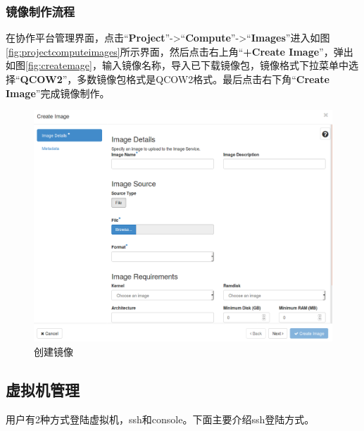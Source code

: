 \documentclass[12pt]{ctexart}%
\begin{document}
\subsubsection{镜像制作流程}
在协作平台管理界面，点击``\textbf{Project}''->``\textbf{Compute}''->``\textbf{Images}''进入如图\ref{fig:projectcomputeimages}所示界面，然后点击右上角``\textbf{+Create Image}''，弹出如图\ref{fig:createmage}，输入镜像名称，导入已下载镜像包，镜像格式下拉菜单中选择``\textbf{QCOW2}''，多数镜像包格式是QCOW2格式。最后点击右下角``\textbf{Create Image}''完成镜像制作。
\begin{figure}[!htb]
\centering
\includegraphics[width=6in]{./figures/CreateImage}
\caption{创建镜像}
\label{fig:createimage}
\end{figure}
\subsection{虚拟机管理}
用户有2种方式登陆虚拟机，ssh和console。下面主要介绍ssh登陆方式。
\end{document}
